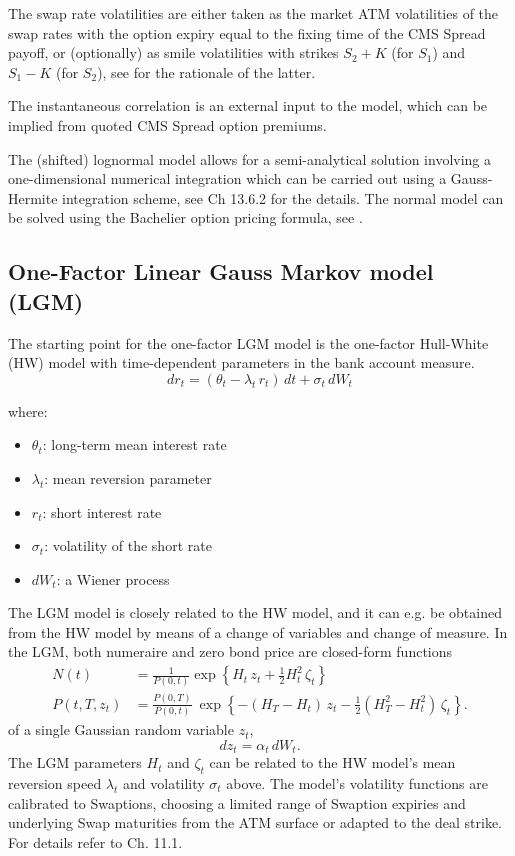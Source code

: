 The swap rate volatilities are either taken as the market ATM volatilities of 
the swap rates with the option expiry equal to the fixing time of the CMS Spread 
payoff, or (optionally) as smile volatilities with strikes $S_2+K$ (for $S_1$) and 
$S_1-K$ (for $S_2$), see \cite{Berrahoui_2004} for the rationale of the latter.

The instantaneous correlation is an external input to the model, which can be 
implied from quoted CMS Spread option premiums.

The (shifted) lognormal model allows for a semi-analytical solution involving 
a one-dimensional numerical integration which can be carried out using a 
Gauss-Hermite integration scheme, see \cite{Brigo_Mercurio_2006} Ch 13.6.2 for 
the details. The normal model can be solved using the Bachelier option pricing 
formula, see \cite{Caspers_2015}.

\subsection{One-Factor Linear Gauss Markov model (LGM)}
\label{models:LGM}

The starting point for the one-factor LGM model is the one-factor Hull-White (HW)
model with time-dependent parameters in the bank account measure. 
$$
dr_t = (\theta_t-\lambda_t \,r_t)\,dt + \sigma_t\, dW_t
$$

where:
\begin{itemize}
\item $\theta_t$: long-term mean interest rate
\item $\lambda_t$: mean reversion parameter
\item $r_t$: short interest rate 
\item $\sigma_t$: volatility of the short rate
\item $dW_t$: a Wiener process
\end{itemize}

The LGM model is closely related to the HW model, and it can e.g. be 
obtained from the HW model by means of a change of variables and change of measure. 
In the LGM, both numeraire and zero bond price are closed-form functions 
\begin{align*}
N(t) &= \frac{1}{P(0,t)}\exp\left\{H_t\, z_t + \frac{1}{2}H^2_t\,\zeta_t \right\} \\
P(t,T,z_t)
&= \frac{P(0,T)}{P(0,t)}\:\exp\left\{ -(H_T-H_t)\,z_t - \frac{1}{2} \left(H^2_T-H^2_t\right)\,\zeta_t\right\}.
\end{align*}
of a single Gaussian random variable $z_t$,
$$
dz_t=\alpha_t\, dW_t.
$$
The LGM parameters $H_t$ and $\zeta_t$ can be related to the HW 
model's mean reversion speed $\lambda_t$ and volatility $\sigma_t$ above.
The model's volatility functions are calibrated to Swaptions, choosing 
a limited range of Swaption expiries and underlying Swap maturities from the 
ATM surface or adapted to the deal strike. %
%
For details refer to \cite{LSG_2015} Ch. 11.1.

